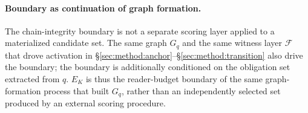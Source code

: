 \paragraph{Boundary as continuation of graph formation.}
The chain-integrity boundary is not a separate scoring layer applied to a
materialized candidate set. The same graph $G_q$ and the same witness
layer $\mathcal{F}$ that drove activation in
\S\ref{sec:method:anchor}--\S\ref{sec:method:transition} also drive the
boundary; the boundary is additionally conditioned on the obligation set
extracted from $q$. $E_K$ is thus the reader-budget boundary of the same
graph-formation process that built $G_q$, rather than an independently
selected set produced by an external scoring procedure.
